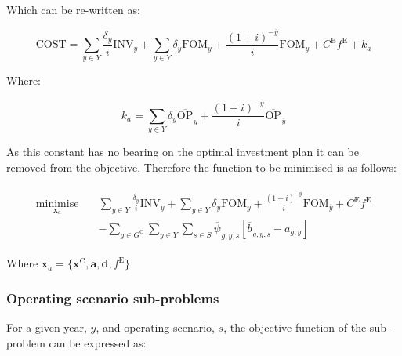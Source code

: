 \documentclass{article}
\newcommand{\sGeneratorsCandidate}{G^{\mathrm{C}}}
\newcommand{\sYears}{Y}
\newcommand{\sScenarios}{S}
\newcommand{\iGenerator}{g}
\newcommand{\iYear}{y}
\newcommand{\iYearTerminal}{\overline{\iYear}}
\newcommand{\iScenario}{s}
\newcommand{\cOperatingCost}[1][\iYear,\iScenario]{\mathrm{OP}_{#1}}
\newcommand{\cFixedOperationsMaintenanceCost}[1][\iYear]{\mathrm{FOM}_{#1}}
\newcommand{\cInvestmentCost}[1][\iYear]{\mathrm{INV}_{#1}}
\newcommand{\cInterestRate}{i}
\newcommand{\cEmissionsTargetViolationPenalty}{C^{\mathrm{E}}}
\newcommand{\cObjectiveFunction}{\mathrm{COST}}
\newcommand{\cDiscountRate}[1][\iYear]{\delta_{#1}}
\newcommand{\vEmissionsTargetViolation}{f^{\mathrm{E}}}
\newcommand{\vInstalledCapacityTotal}[1][\iGenerator,\iYear]{a_{#1}}
\newcommand{\vInstalledCapacityTotalScenario}[1][\iGenerator,\iYear,\iScenario]{b_{#1}}
\newcommand{\vFixedCapacityDual}[1][\iGenerator,\iYear,\iScenario]{\psi_{#1}}
\DeclareMathOperator*{\minimise}{minimise}
\begin{document}
Which can be re-written as:

\begin{equation}
	\cObjectiveFunction = \sum\limits_{\iYear \in \sYears} \frac{\cDiscountRate}{\cInterestRate}\cInvestmentCost + \sum\limits_{\iYear \in \sYears} \cDiscountRate \cFixedOperationsMaintenanceCost  + \frac{(1+\cInterestRate)^{-\iYearTerminal}}{\cInterestRate} \cFixedOperationsMaintenanceCost[\iYearTerminal] + \cEmissionsTargetViolationPenalty \vEmissionsTargetViolation + k_{a}
\end{equation}

Where:

\begin{equation}
	k_{a} = \sum\limits_{\iYear \in \sYears} \cDiscountRate \overline{\cOperatingCost[]}_{\iYear} + \frac{(1+\cInterestRate)^{-\iYearTerminal}}{\cInterestRate} \overline{\cOperatingCost[]}_{\iYearTerminal}
\end{equation}

As this constant has no bearing on the optimal investment plan it can be removed from the objective. Therefore the function to be minimised is as follows:

\begin{align}
	\begin{split}
		\minimise\limits_{\bm{x}_{a}} \quad & \sum\limits_{\iYear \in \sYears} \frac{\cDiscountRate}{\cInterestRate}\cInvestmentCost + \sum\limits_{\iYear \in \sYears} \cDiscountRate \cFixedOperationsMaintenanceCost  + \frac{(1+\cInterestRate)^{-\iYearTerminal}}{\cInterestRate} \cFixedOperationsMaintenanceCost[\iYearTerminal] + \cEmissionsTargetViolationPenalty \vEmissionsTargetViolation\\
		& - \sum\limits_{\iGenerator \in \sGeneratorsCandidate}\sum\limits_{\iYear \in \sYears}\sum\limits_{\iScenario \in \sScenarios} \overline{\vFixedCapacityDual[]}_{\iGenerator,\iYear,\iScenario}\left[\overline{\vInstalledCapacityTotalScenario[]}_{\iGenerator,\iYear,\iScenario} - \vInstalledCapacityTotal\right]
	\end{split}
\end{align}

Where $\bm{x}_{a} = \{\bm{x}^{\mathrm{C}}, \bm{a}, \bm{d}, \vEmissionsTargetViolation\}$

\subsubsection{Operating scenario sub-problems}
For a given year, $\iYear$, and operating scenario, $\iScenario$, the objective function of the sub-problem can be expressed as:
\end{document}
